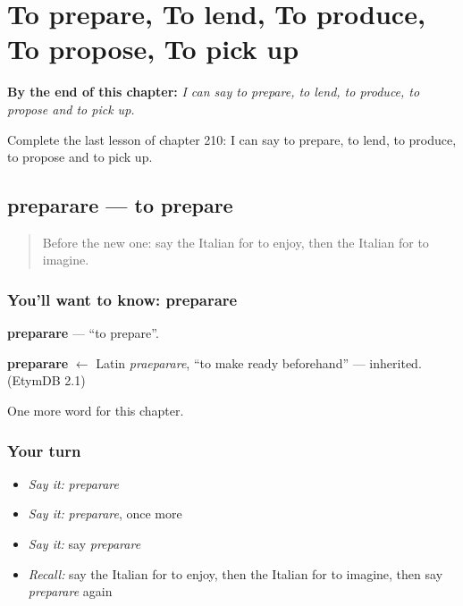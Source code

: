 
\chapter{To prepare, To lend, To produce, To propose, To pick up}
\label{ch:it-to-prepare-to-lend-to-produce-to-propose-to-pick-up}

\begin{chapteropening}
\textbf{By the end of this chapter:} \emph{I can say to prepare, to lend, to produce, to propose and to pick up.}

Complete the last lesson of chapter 210: I can say to prepare, to lend, to produce, to propose and to pick up.
\end{chapteropening}

\section[preparare]{preparare — to prepare}

\label{lesson:IT-C210-preparare}



\begin{quote}
Before the new one: say the Italian for to enjoy, then the Italian for to imagine.
\end{quote}

\subsection*{You'll want to know: preparare}
\textbf{preparare} — \textquotedblleft{}to prepare\textquotedblright{}.

\begin{cousinweb}
\textbf{preparare} $\leftarrow$ Latin \emph{praeparare}, \textquotedblleft{}to make ready beforehand\textquotedblright{} — inherited. (EtymDB 2.1)
\end{cousinweb}

\begin{grammarlens}[title={What you've built}]
One more word for this chapter.
\end{grammarlens}

\subsection*{Your turn}
\begin{itemize}
\raggedright
  \item \emph{Say it:} \emph{preparare}
  \item \emph{Say it:} \emph{preparare}, once more
  \item \emph{Say it:} say \emph{preparare}
  \item \emph{Recall:} say the Italian for to enjoy, then the Italian for to imagine, then say \emph{preparare} again
\end{itemize}

